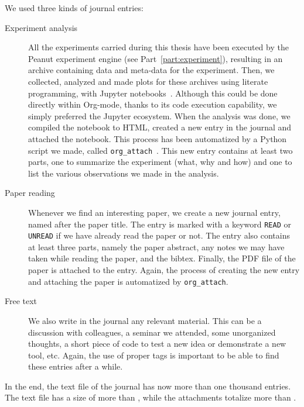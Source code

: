    We used three kinds of journal entries:
    \begin{description}
        \item[Experiment analysis] All the experiments carried during this thesis have been executed by the Peanut
            experiment engine (see Part~\ref{part:experiment}), resulting in an archive containing data and meta-data
            for the experiment. Then, we collected, analyzed and made plots for these archives using literate
            programming, with Jupyter notebooks~\cite{jupyter}. Although this could be done directly within Org-mode,
            thanks to its code execution capability, we simply preferred the Jupyter ecosystem. When the analysis was
            done, we compiled the notebook to HTML, created a new entry in the journal and attached the notebook. This
            process has been automatized by a Python script we made, called \texttt{org\_attach}~\cite{org_attach}. This
            new entry contains at least two parts, one to summarize the experiment (what, why and how) and one to list
            the various observations we made in the analysis.
        \item[Paper reading] Whenever we find an interesting paper, we create a new journal entry, named after the paper
            title. The entry is marked with a keyword \texttt{READ} or \texttt{UNREAD} if we have already read the
            paper or not. The entry also contains at least three parts, namely the paper abstract, any notes we may have
            taken while reading the paper, and the bibtex. Finally, the PDF file of the paper is attached to the entry.
            Again, the process of creating the new entry and attaching the paper is automatized by \texttt{org\_attach}.
        \item[Free text] We also write in the journal any relevant material. This can be a discussion with colleagues,
            a seminar we attended, some unorganized thoughts, a short piece of code to test a new idea or demonstrate a
            new tool, etc. Again, the use of proper tags is important to be able to find these entries after a while.
    \end{description}

    In the end, the text file of the journal has now more than one thousand entries. The text file has a size of more
    than , while the attachments totalize more than .

